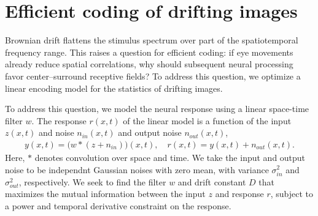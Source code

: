 \documentclass[12pt]{article}
\newcommand{\afbcomment}[1]{\textcolor{alexcolor}{#1}}
\begin{document}
\section{Efficient coding of drifting images}
Brownian drift flattens the stimulus spectrum over part of the spatiotemporal frequency range. This raises a question for efficient coding: if eye movements already reduce spatial correlations, why should subsequent neural processing favor center–surround receptive fields? To address this question, we optimize a linear encoding model for the statistics of drifting images.

To address this question, we model the neural response using a linear space-time filter $w$. The response $r(x,t)$ of the linear model is a function of the input $z(x,t)$ and noise $n_{in}(x,t)$ and output noise $n_{out}(x,t)$,
\begin{align}
    y(x,t) = \big(w*(z+n_{in})\big)(x,t), \quad r(x,t)=y(x,t)+n_{out}(x,t).
\end{align}
Here, $*$ denotes convolution over space and time. We take the input and output noise to be independnt Gaussian noises with zero mean, with variance $\sigma_{in}^2$ and $\sigma_{out}^2$, respectively. We seek to find the filter $w$ and drift constant $D$ that maximizes the mutual information between the input $z$ and response $r$, subject to a power and temporal derivative constraint on the response.  
\end{document}
